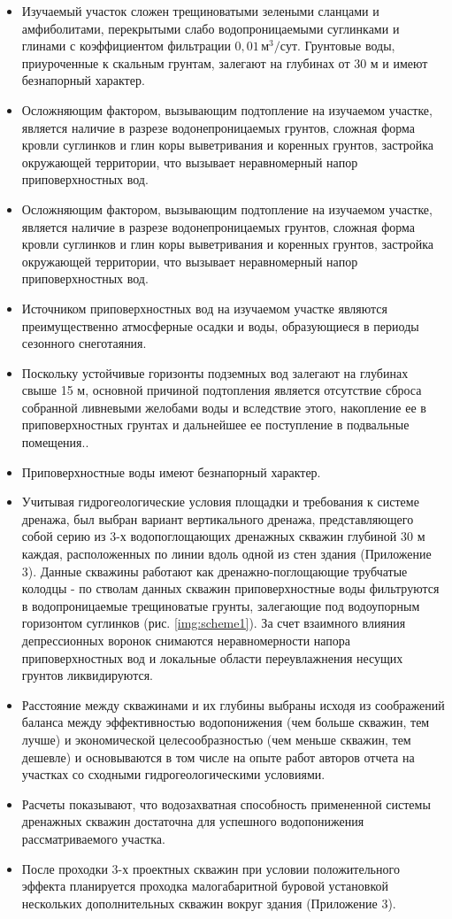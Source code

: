 \documentclass[a4paper,12pt]{article} %
\begin{document}
\begin{itemize}

\item Изучаемый участок сложен  трещиноватыми зелеными сланцами и амфиболитами, перекрытыми слабо водопроницаемыми суглинками и глинами с коэффициентом фильтрации $0,01 \, м^3/сут$. Грунтовые воды, приуроченные к скальным грунтам, залегают на глубинах от 30 м и имеют безнапорный характер.
\item Осложняющим фактором, вызывающим подтопление на изучаемом участке, является наличие в разрезе водонепроницаемых грунтов, сложная форма кровли суглинков и глин коры выветривания и коренных грунтов, застройка окружающей территории, что вызывает неравномерный напор приповерхностных вод.
\item Осложняющим фактором, вызывающим подтопление на изучаемом участке, является наличие в разрезе водонепроницаемых грунтов, сложная форма кровли суглинков и глин коры выветривания и коренных грунтов, застройка окружающей территории, что вызывает неравномерный напор приповерхностных вод.
\item Источником приповерхностных вод на изучаемом участке являются преимущественно атмосферные осадки и воды, образующиеся в периоды сезонного снеготаяния.
\item Поскольку устойчивые горизонты подземных вод залегают на глубинах свыше 15 м, основной причиной подтопления является отсутствие сброса собранной ливневыми желобами воды и вследствие этого, накопление ее в приповерхностных грунтах и дальнейшее ее поступление в подвальные помещения..
\item Приповерхностные воды имеют безнапорный характер.
\item Учитывая гидрогеологические условия площадки и требования к системе дренажа, был выбран вариант вертикального дренажа, представляющего собой серию из 3-х водопоглощающих дренажных скважин глубиной 30 м каждая, расположенных по линии вдоль одной из стен здания (Приложение 3). Данные скважины работают как дренажно-поглощающие трубчатые колодцы - по стволам данных скважин приповерхностные воды фильтруются в водопроницаемые трещиноватые грунты, залегающие под  водоупорным горизонтом суглинков (рис. \ref{img:scheme1}). За счет взаимного влияния депрессионных воронок снимаются неравномерности напора приповерхностных вод и локальные области переувлажнения несущих грунтов ликвидируются. 
\item Расстояние между скважинами и их глубины выбраны исходя из соображений баланса между эффективностью водопонижения (чем больше скважин, тем лучше) и экономической целесообразностью (чем меньше скважин, тем дешевле) и основываются в том числе на опыте работ авторов отчета на участках со сходными гидрогеологическими условиями.
\item Расчеты показывают, что водозахватная способность примененной системы дренажных скважин достаточна для успешного водопонижения рассматриваемого участка.
\item После проходки 3-х проектных скважин при условии положительного эффекта планируется проходка малогабаритной буровой установкой нескольких дополнительных скважин вокруг здания (Приложение 3).

\end{itemize}
\end{document}
